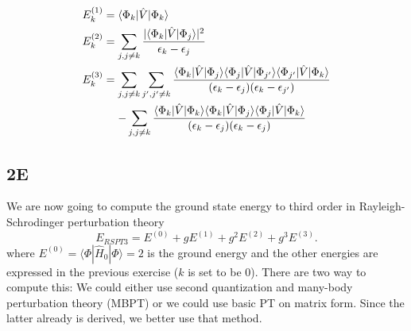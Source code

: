 \documentclass[norsk,a4paper,12pt]{article}
\begin{document}
\begin{align}
E_k^{(1)}&=\langle\Phi_k|\hat{V}|\Phi_k\rangle\\
E_k^{(2)}&=\sum_{j,j\neq k}\frac{|\langle\Phi_k|\hat{V}|\Phi_j\rangle|^2}{\epsilon_k-\epsilon_j}\\
E_k^{(3)}&=\sum_{j,j\neq k}\sum_{j',j'\neq k}\frac{\langle\Phi_k|\hat{V}|\Phi_j\rangle\langle\Phi_j|\hat{V}|\Phi_{j'}\rangle\langle\Phi_{j'}|\hat{V}|\Phi_k\rangle}{(\epsilon_k-\epsilon_j)(\epsilon_k-\epsilon_{j'})}\notag\\
&\mathrel{\phantom{=}}-\sum_{j,j\neq k}\frac{\langle\Phi_k|\hat{V}|\Phi_k\rangle\langle\Phi_k|\hat{V}|\Phi_{j}\rangle\langle\Phi_j|\hat{V}|\Phi_k\rangle}{(\epsilon_k-\epsilon_j)(\epsilon_k-\epsilon_j)}
\end{align}

\subsection*{2E}
We are now going to compute the ground state energy to third order in Rayleigh-Schrodinger perturbation theory
\begin{equation}
E_{RSPT3}=E^{(0)}+gE^{(1)}+g^2E^{(2)}+g^3E^{(3)}.
\end{equation}
where $E^{(0)}=\langle\Phi|\hat{H}_0|\Phi\rangle=2$ is the ground energy and the other energies are expressed in the previous exercise ($k$ is set to be 0). There are two way to compute this: We could either use second quantization and many-body perturbation theory (MBPT) or we could use basic PT on matrix form. Since the latter already is derived, we better use that method. 
\end{document}
